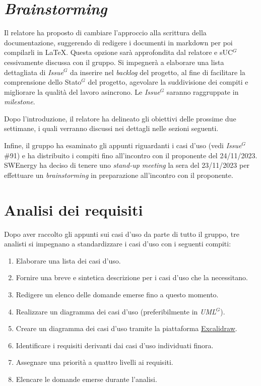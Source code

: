 \section{\textit{Brainstorming}}

Il relatore ha proposto di cambiare l'approccio alla scrittura della
documentazione, suggerendo di redigere i documenti in markdown per poi
compilarli in \LaTeX{}. Questa opzione sarà approfondita dal relatore e
s\gls{UC}$^G$cessivamente discussa con il gruppo. Si impegnerà a elaborare una lista
dettagliata di \textit{\gls{Issue}$^G$} da inserire nel \textit{backlog} del progetto, al
fine di facilitare la comprensione dello \gls{Stato}$^G$ del progetto, agevolare la
suddivisione dei compiti e migliorare la qualità del lavoro asincrono. Le
\textit{\gls{Issue}$^G$} saranno raggruppate in \textit{milestone}.

Dopo l'introduzione, il relatore ha delineato gli obiettivi delle prossime due
settimane, i quali verranno discussi nei dettagli nelle sezioni seguenti.

Infine, il gruppo ha esaminato gli appunti riguardanti i casi d'uso (vedi
\textit{\gls{Issue}$^G$} \#91) e ha distribuito i compiti fino all'incontro con il
proponente del 24/11/2023. SWEnergy ha deciso di tenere uno \textit{stand-up
	meeting} la sera del 23/11/2023 per effettuare un \textit{brainstorming} in
preparazione all'incontro con il proponente.

\section{Analisi dei requisiti}

Dopo aver raccolto gli appunti sui casi d'uso da parte di tutto il gruppo, tre
analisti si impegnano a standardizzare i casi d'uso con i seguenti compiti:

\begin{enumerate}
	\item Elaborare una lista dei casi d'uso.
	\item Fornire una breve e sintetica descrizione per i casi d'uso che la
	      necessitano.
	\item Redigere un elenco delle domande emerse fino a questo momento.
	\item Realizzare un diagramma dei casi d'uso (preferibilmente in
	      \textit{\gls{UML}$^G$}).
	\item Creare un diagramma dei casi d'uso tramite la piattaforma
	      \href{https://excalidraw.com/}{Excalidraw}.
	\item Identificare i requisiti derivanti dai casi d'uso individuati finora.
	\item Assegnare una priorità a quattro livelli ai requisiti.
	\item Elencare le domande emerse durante l'analisi.
\end{enumerate}

